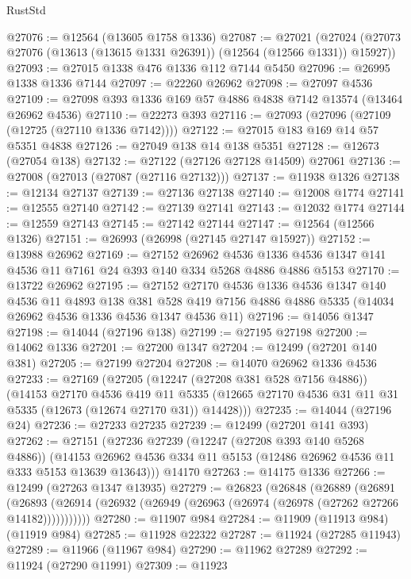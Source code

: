 \begin{lexlean}{RustStd}
\begin{coremodule}
{\begin{coremodule}
{{{{{{{{{{{{{{{{{{{{{{{{{{{{{{{{{{{{{{{{{{{{{{{{{{{{{{{{{{{{{{{{{{{{{{{{{{{{{{{{@27076 := @12564 (@13605 @1758 @1336)
@27087 := @27021
    (@27024 (@27073 @27076 (@13613 (@13615 @1331 @26391)) (@12564 (@12566 @1331)) @15927))
@27093 := @27015 @1338 @476 @1336 @112 @7144 @5450
@27096 := @26995 @1338 @1336 @7144
@27097 := @22260 @26962
@27098 := @27097 @4536
@27109 := @27098 @393 @1336 @169 @57 @4886 @4838 @7142 @13574 (@13464 @26962 @4536)
@27110 := @22273 @393
@27116 := @27093 (@27096 (@27109 (@12725 (@27110 @1336 @7142))))
@27122 := @27015 @183 @169 @14 @57 @5351 @4838
@27126 := @27049 @138 @14 @138 @5351
@27128 := @12673 (@27054 @138)
@27132 := @27122 (@27126 @27128 @14509) @27061
@27136 := @27008 (@27013 (@27087 (@27116 @27132)))
@27137 := @11938 @1326
@27138 := @12134 @27137
@27139 := @27136 @27138
@27140 := @12008 @1774
@27141 := @12555 @27140
@27142 := @27139 @27141
@27143 := @12032 @1774
@27144 := @12559 @27143
@27145 := @27142 @27144
@27147 := @12564 (@12566 @1326)
@27151 := @26993 (@26998 (@27145 @27147 @15927))
@27152 := @13988 @26962
@27169 := @27152
    @26962
    @4536
    @1336
    @4536
    @1347
    @141
    @4536
    @11
    @7161
    @24
    @393
    @140
    @334
    @5268
    @4886
    @4886
    @5153
@27170 := @13722 @26962
@27195 := @27152
    @27170
    @4536
    @1336
    @4536
    @1347
    @140
    @4536
    @11
    @4893
    @138
    @381
    @528
    @419
    @7156
    @4886
    @4886
    @5335
    (@14034 @26962 @4536 @1336 @4536 @1347 @4536 @11)
@27196 := @14056 @1347
@27198 := @14044 (@27196 @138)
@27199 := @27195 @27198
@27200 := @14062 @1336
@27201 := @27200 @1347
@27204 := @12499 (@27201 @140 @381)
@27205 := @27199 @27204
@27208 := @14070 @26962 @1336 @4536
@27233 := @27169
    (@27205
      (@12247 (@27208 @381 @528 @7156 @4886))
      (@14153
        @27170
        @4536
        @419
        @11
        @5335
        (@12665 @27170 @4536 @31 @11 @31 @5335 (@12673 (@12674 @27170 @31)) @14428)))
@27235 := @14044 (@27196 @24)
@27236 := @27233 @27235
@27239 := @12499 (@27201 @141 @393)
@27262 := @27151
    (@27236
      @27239
      (@12247 (@27208 @393 @140 @5268 @4886))
      (@14153 @26962 @4536 @334 @11 @5153 (@12486 @26962 @4536 @11 @333 @5153 @13639 @13643)))
    @14170
@27263 := @14175 @1336
@27266 := @12499 (@27263 @1347 @13935)
@27279 := @26823
    (@26848
      (@26889
        (@26891
          (@26893 (@26914 (@26932 (@26949 (@26963 (@26974 (@26978 (@27262 @27266 @14182)))))))))))
@27280 := @11907 @984
@27284 := @11909 (@11913 @984) (@11919 @984)
@27285 := @11928 @22322
@27287 := @11924 (@27285 @11943)
@27289 := @11966 (@11967 @984)
@27290 := @11962 @27289
@27292 := @11924 (@27290 @11991)
@27309 := @11923
}}}}}}}}}}}}}}}}}}}}}}}}}}}}}}}}}}}}}}}}}}}}}}}}}}}}}}}}}}}}}}}}}}}}}}}}}}}}}}}}
\end{coremodule}}
\end{coremodule}
\end{lexlean}
